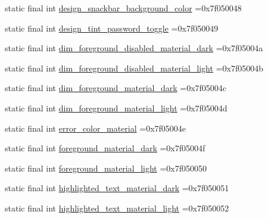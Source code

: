 \begin{DoxyCompactItemize}
\item 
static final int \mbox{\hyperlink{classbr_1_1unb_1_1cic_1_1mp_1_1marketmaster_1_1test_1_1R_1_1color_a3baf640f9b0d5c2a0971f4a9cddda247}{design\+\_\+snackbar\+\_\+background\+\_\+color}} =0x7f050048
\item 
static final int \mbox{\hyperlink{classbr_1_1unb_1_1cic_1_1mp_1_1marketmaster_1_1test_1_1R_1_1color_a2835a4a24a6b0fdeff7355f717bd6037}{design\+\_\+tint\+\_\+password\+\_\+toggle}} =0x7f050049
\item 
static final int \mbox{\hyperlink{classbr_1_1unb_1_1cic_1_1mp_1_1marketmaster_1_1test_1_1R_1_1color_a4a7387547005b088a604aca2c210b817}{dim\+\_\+foreground\+\_\+disabled\+\_\+material\+\_\+dark}} =0x7f05004a
\item 
static final int \mbox{\hyperlink{classbr_1_1unb_1_1cic_1_1mp_1_1marketmaster_1_1test_1_1R_1_1color_a0c3134f964215aca660297d59b3c7d44}{dim\+\_\+foreground\+\_\+disabled\+\_\+material\+\_\+light}} =0x7f05004b
\item 
static final int \mbox{\hyperlink{classbr_1_1unb_1_1cic_1_1mp_1_1marketmaster_1_1test_1_1R_1_1color_abd06bcf72e73ac5f2e19eed69af162a0}{dim\+\_\+foreground\+\_\+material\+\_\+dark}} =0x7f05004c
\item 
static final int \mbox{\hyperlink{classbr_1_1unb_1_1cic_1_1mp_1_1marketmaster_1_1test_1_1R_1_1color_a3eb46bbc0100dc0de5a48f8132619d26}{dim\+\_\+foreground\+\_\+material\+\_\+light}} =0x7f05004d
\item 
static final int \mbox{\hyperlink{classbr_1_1unb_1_1cic_1_1mp_1_1marketmaster_1_1test_1_1R_1_1color_a57b86b9b670f24e9fcb46e1d44b01bc6}{error\+\_\+color\+\_\+material}} =0x7f05004e
\item 
static final int \mbox{\hyperlink{classbr_1_1unb_1_1cic_1_1mp_1_1marketmaster_1_1test_1_1R_1_1color_a8374a1eef6acd9fa1c757d4abd9e5f34}{foreground\+\_\+material\+\_\+dark}} =0x7f05004f
\item 
static final int \mbox{\hyperlink{classbr_1_1unb_1_1cic_1_1mp_1_1marketmaster_1_1test_1_1R_1_1color_afbd9310b9601fce36b8a1503a3823f15}{foreground\+\_\+material\+\_\+light}} =0x7f050050
\item 
static final int \mbox{\hyperlink{classbr_1_1unb_1_1cic_1_1mp_1_1marketmaster_1_1test_1_1R_1_1color_ae20207aa644810898f74c329cb946bc1}{highlighted\+\_\+text\+\_\+material\+\_\+dark}} =0x7f050051
\item 
static final int \mbox{\hyperlink{classbr_1_1unb_1_1cic_1_1mp_1_1marketmaster_1_1test_1_1R_1_1color_af1dbf42a0aba912cefe227ca5d32a76b}{highlighted\+\_\+text\+\_\+material\+\_\+light}} =0x7f050052

\end{DoxyCompactItemize}
